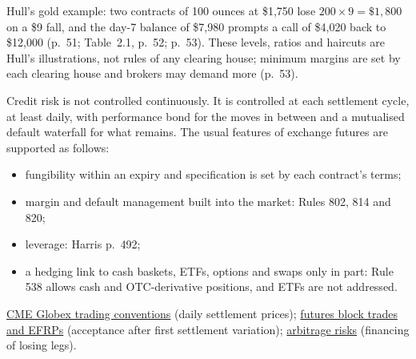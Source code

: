 \begin{qfmechanism}
Hull's gold example: two contracts of 100 ounces at \$1{,}750 lose $200\times9=\$1{,}800$ on a \$9 fall, and the day-7 balance of \$7{,}980 prompts a call of \$4{,}020 back to \$12{,}000 (p.~51; Table~2.1, p.~52; p.~53). These levels, ratios and haircuts are Hull's illustrations, not rules of any clearing house; minimum margins are set by each clearing house and brokers may demand more (p.~53).

 Credit risk is not controlled continuously. It is controlled at each settlement cycle, at least daily, with performance bond for the moves in between and a mutualised default waterfall for what remains. The usual features of exchange futures are supported as follows:
\begin{itemize}
\item fungibility within an expiry and specification is set by each contract's terms;
\item margin and default management built into the market: Rules 802, 814 and 820;
\item leverage: Harris p.~492;
\item a hedging link to cash baskets, ETFs, options and swaps only in part: Rule 538 allows cash and OTC-derivative positions, and ETFs are not addressed.
\end{itemize}

 \hyperref[conv:cme-globex-trading]{CME Globex trading conventions} (daily settlement prices); \hyperref[conv:futures-block-efrp]{futures block trades and EFRPs} (acceptance after first settlement variation); \hyperref[res:arbitrage-risks]{arbitrage risks} (financing of losing legs).

\end{qfmechanism}

